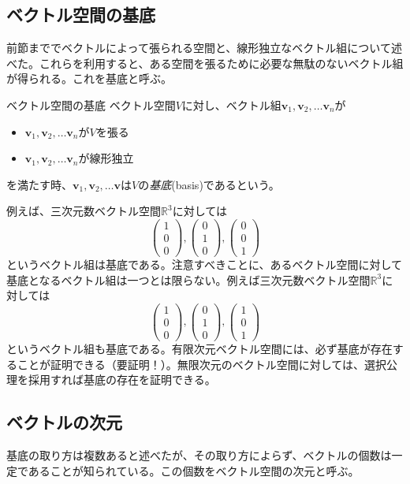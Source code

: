 \subsection{ベクトル空間の基底}
前節まででベクトルによって張られる空間と、線形独立なベクトル組について述べた。これらを利用すると、ある空間を張るために必要な無駄のないベクトル組が得られる。これを基底と呼ぶ。
\begin{definition*}{ベクトル空間の基底}
	ベクトル空間\(V\)に対し、ベクトル組\(\boldsymbol{v}_1,\boldsymbol{v}_2,\dots\boldsymbol{v}_n\)が
	\begin{itemize}
		\item \(\boldsymbol{v}_1,\boldsymbol{v}_2,\dots\boldsymbol{v}_n\)が\(V\)を張る
		\item \(\boldsymbol{v}_1,\boldsymbol{v}_2,\dots\boldsymbol{v}_n\)が線形独立
	\end{itemize}
	を満たす時、\(\boldsymbol{v}_1,\boldsymbol{v}_2,\dots\boldsymbol{v}\)は\(V\)の\emph{基底}(basis)であるという。
\end{definition*}
例えば、三次元数ベクトル空間\(\mathbb{R}^3\)に対しては
\begin{equation}
	\begin{pmatrix} 1 \\0 \\ 0 \end{pmatrix},\begin{pmatrix} 0 \\1 \\ 0 \end{pmatrix},\begin{pmatrix} 0 \\0 \\ 1 \end{pmatrix}
\end{equation}
というベクトル組は基底である。注意すべきことに、あるベクトル空間に対して基底となるベクトル組は一つとは限らない。例えば三次元数ベクトル空間\(\mathbb{R}^3\)に対しては
\begin{equation}
	\begin{pmatrix} 1 \\0 \\ 0 \end{pmatrix},\begin{pmatrix} 0 \\1 \\ 0 \end{pmatrix},\begin{pmatrix} 1 \\0 \\ 1 \end{pmatrix}
\end{equation}
というベクトル組も基底である。有限次元ベクトル空間には、必ず基底が存在することが証明できる（要証明！）。無限次元のベクトル空間に対しては、選択公理を採用すれば基底の存在を証明できる。
\subsection{ベクトルの次元}
基底の取り方は複数あると述べたが、その取り方によらず、ベクトルの個数は一定であることが知られている。この個数をベクトル空間の次元と呼ぶ。
